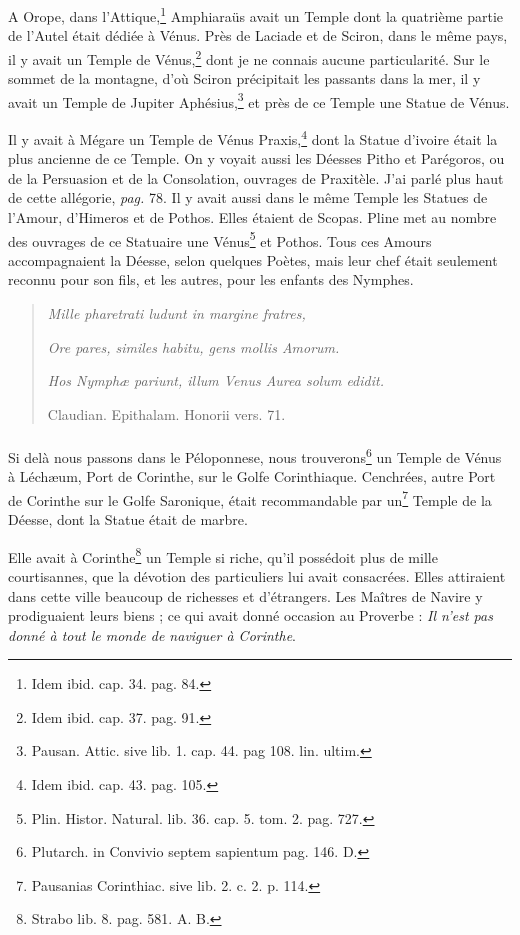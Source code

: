 \documentclass[a4paper, 18pt, oneside]{article}
\begin{document}
A Orope, dans l'Attique,\footnote{Idem ibid. cap. 34. pag. 84.} Amphiaraüs avait un Temple dont la quatrième partie de l'Autel était dédiée à Vénus. Près de Laciade et de Sciron, dans le même pays, il y avait un Temple de Vénus,\footnote{Idem ibid. cap. 37. pag. 91.} dont je ne connais aucune particularité. Sur le sommet de la montagne, d'où Sciron précipitait les passants dans la mer, il y avait un Temple de Jupiter Aphésius,\footnote{Pausan. Attic. sive lib. 1. cap. 44. pag 108. lin. ultim.} et près de ce Temple une Statue de Vénus.

Il y avait à Mégare un Temple de Vénus Praxis,\footnote{Idem ibid. cap. 43. pag. 105.} dont la Statue d'ivoire était la plus ancienne de ce Temple. On y voyait aussi les Déesses Pitho et Parégoros, ou de la Persuasion et de la Consolation, ouvrages de Praxitèle. J'ai parlé plus haut de cette allégorie, \emph{pag.} 78. Il y avait aussi dans le même Temple les Statues de l'Amour, d'Himeros et de Pothos. Elles étaient de Scopas. Pline met au nombre des ouvrages de ce Statuaire une Vénus\footnote{Plin. Histor. Natural. lib. 36. cap. 5. tom. 2. pag. 727.} et Pothos. Tous ces Amours accompagnaient la Déesse, selon quelques Poètes, mais leur chef était seulement reconnu pour son fils, et les autres, pour les enfants des Nymphes.
\begin{quotation}
\emph{Mille pharetrati ludunt in margine fratres,}

\emph{Ore pares, similes habitu, gens mollis Amorum.}

\emph{Hos Nymphæ pariunt, illum Venus Aurea solum edidit.}

\hspace*{30mm}Claudian. Epithalam. Honorii vers. 71.
\end{quotation}
\paragraph{}
Si delà nous passons dans le Péloponnese, nous trouverons\footnote{Plutarch. in Convivio septem sapientum pag. 146. D.} un Temple de Vénus à Léchæum, Port de Corinthe, sur le Golfe Corinthiaque. Cenchrées, autre Port de Corinthe sur le Golfe Saronique, était recommandable par un\footnote{Pausanias Corinthiac. sive lib. 2. c. 2. p. 114.} Temple de la Déesse, dont la Statue était de marbre.

Elle avait à Corinthe\footnote{Strabo lib. 8. pag. 581. A. B.} un Temple si riche, qu'il possédoit plus de mille courtisannes, que la dévotion des particuliers lui avait consacrées. Elles attiraient dans cette ville beaucoup de richesses et d'étrangers. Les Maîtres de Navire y prodiguaient leurs biens ; ce qui avait donné occasion au Proverbe : \emph{Il n'est pas donné à tout le monde de naviguer à Corinthe}.
\end{document}
